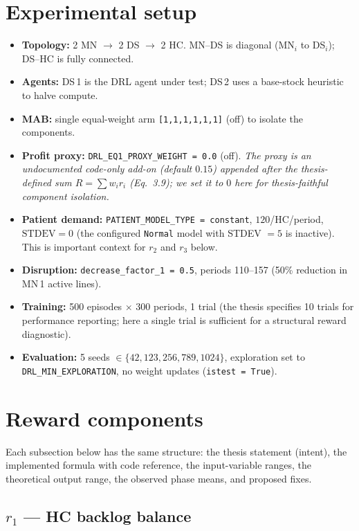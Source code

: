 \documentclass[11pt,letterpaper]{article}
\newcommand{\code}[1]{\texttt{\small #1}}
\begin{document}
\section{Experimental setup}

\begin{itemize}
  \item \textbf{Topology:} 2 MN $\to$ 2 DS $\to$ 2 HC.  MN--DS is diagonal (MN$_i$ to DS$_i$); DS--HC is fully connected.
  \item \textbf{Agents:} DS\,1 is the DRL agent under test; DS\,2 uses a base-stock heuristic to halve compute.
  \item \textbf{MAB:} single equal-weight arm \code{[1,1,1,1,1,1]} (off) to isolate the components.
  \item \textbf{Profit proxy:} \code{DRL\_EQ1\_PROXY\_WEIGHT = 0.0} (off).  \emph{The proxy is an undocumented code-only add-on (default $0.15$) appended after the thesis-defined sum $R = \sum w_i r_i$ (Eq.~3.9); we set it to $0$ here for thesis-faithful component isolation.}
  \item \textbf{Patient demand:} \code{PATIENT\_MODEL\_TYPE = constant}, $120$/HC/period, $\text{STDEV} = 0$ (the configured \code{Normal} model with STDEV $= 5$ is inactive).  This is important context for $r_2$ and $r_3$ below.
  \item \textbf{Disruption:} \code{decrease\_factor\_1 = 0.5}, periods 110--157 (50\% reduction in MN\,1 active lines).
  \item \textbf{Training:} 500 episodes $\times$ 300 periods, 1 trial (the thesis specifies 10 trials for performance reporting; here a single trial is sufficient for a structural reward diagnostic).
  \item \textbf{Evaluation:} 5 seeds $\in \{42, 123, 256, 789, 1024\}$, exploration set to \code{DRL\_MIN\_EXPLORATION}, no weight updates (\code{istest = True}).
\end{itemize}

\section{Reward components}

Each subsection below has the same structure: the thesis statement (intent), the implemented formula with code reference, the input-variable ranges, the theoretical output range, the observed phase means, and proposed fixes.

\subsection{$r_1$ --- HC backlog balance}
\end{document}
